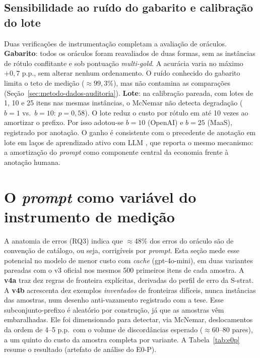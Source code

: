 \subsection{Sensibilidade ao ruído do gabarito e calibração do lote}
\label{sec:res-e0-ruido-gabarito}

Duas verificações de instrumentação completam a avaliação de oráculos.
\textbf{Gabarito}: todos os oráculos foram reavaliados de duas formas, sem as
instâncias de rótulo conflitante e sob pontuação \emph{multi-gold}. A acurácia
varia no máximo $+0{,}7$ p.p., sem alterar nenhum ordenamento. O ruído
conhecido do gabarito limita o teto de medição ($\approx 99{,}3\%$), mas não
contamina as comparações (Seção~\ref{sec:metodo-dados-auditoria}). \textbf{Lote}: na calibração pareada, com lotes de 1, 10 e 25 itens nas mesmas
instâncias, o McNemar não detecta degradação ($b=1$ vs.\ $b=10$: $p=0{,}58$). O
lote reduz o custo por rótulo em até 10 vezes ao amortizar o prefixo. Por isso
adotou-se $b=10$ (OpenAI) e $b=25$ (MaaS), registrado por anotação. O ganho é consistente com o precedente de anotação em lote em laços de
aprendizado ativo com LLM \citep{Kholodna2024}, que reporta o mesmo mecanismo:
a amortização do \textit{prompt} como componente central da economia frente à
anotação humana.

\section{O \textit{prompt} como variável do instrumento de medição}
\label{sec:res-e0p}

A anatomia de erros (RQ3) indica que $\approx 48\%$ dos erros do oráculo são
de convenção de catálogo, ou seja, corrigíveis por \textit{prompt}. Esta seção mede esse potencial no modelo de menor custo com \textit{cache}
(gpt-4o-mini), em duas variantes pareadas com o v3 oficial nos mesmos 500
primeiros itens de cada amostra. A \textbf{v4a} traz dez regras de fronteira
explícitas, derivadas do perfil de erro da S-strat. A \textbf{v4b} acrescenta
dez exemplos \emph{inventados} de fronteiras difíceis, nunca instâncias das
amostras, num desenho anti-vazamento registrado com a tese. Esse subconjunto-prefixo é aleatório por construção, já que as amostras vêm
embaralhadas. Ele foi dimensionado para detectar, via McNemar, deslocamentos da
ordem de 4--5 p.p.\ com o volume de discordâncias esperado ($\approx 60$--$80$
pares), a um quinto do custo da amostra completa por variante.
A Tabela~\ref{tab:e0p} resume o resultado
(artefato de análise do E0-P).

